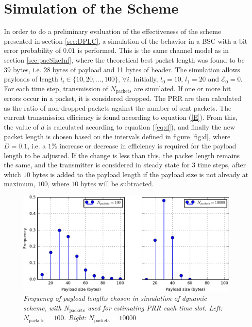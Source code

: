 \section{Simulation of the Scheme}
In order to do a preliminary evaluation of the effectiveness of the scheme presented in section \ref{sec:DPLC}, a simulation of the behavior in a BSC with a bit error probability of $0.01$ is performed. This is the same channel model as in section \ref{sec:pacSizeInf}, where the theoretical best packet length was found to be 39 bytes, i.e. 28 bytes of payload and 11 bytes of header. 
The simulation allows payloads of length $l_i \in \{10, 20, ... , 100\}$, $\forall i$. Initially, $l_0 = 10$, $l_1 = 20$ and $\mathcal{E}_0 = 0$. For each time step, transmission of $N_{\text{packets}}$ are simulated. If one or more bit errors occur in a packet, it is considered dropped. The PRR are then calculated as the ratio of non-dropped packets against the number of sent packets. The current transmission efficiency is found according to equation (\ref{E}). From this, the value of $d$ is calculated according to equation (\ref{eq:d}), and finally the new packet length is chosen based on the intervals defined in figure \ref{fig:d}, where $D=0.1$, i.e. a $1 \%$ increase or decrease in efficiency is required for the payload length to be adjusted. If the change is less than this, the packet length remains the same, and the transmitter is considered in steady state for $3$ time steps, after which $10$ bytes is added to the payload length if the payload size is not already at maximum, $100$, where $10$ bytes will be subtracted.
\\[8pt]
\begin{figure}
\centering
\includegraphics[scale=1]{figs/DPLCsim.pdf} 
\caption{\textit{Frequency of payload lengths chosen in simulation of dynamic scheme, with $N_{\text{packets}}$ used for estimating PRR each time slot.
Left: $N_{\text{packets}}=100$. Right: $N_{\text{packets}} = 10000$}\label{fig:DPLCsim}}
\end{figure}
